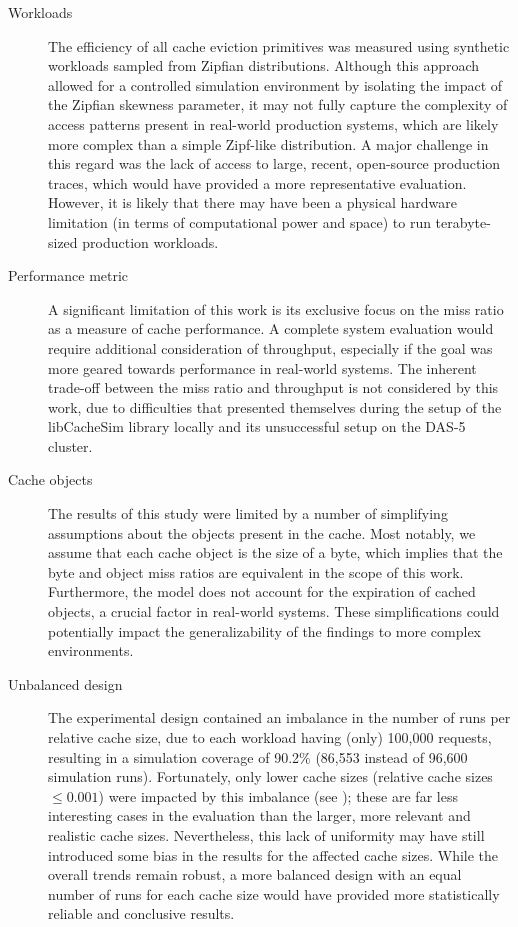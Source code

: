 \begin{description}
    \item[Workloads] The efficiency of all cache eviction primitives was measured using synthetic workloads sampled from Zipfian distributions. Although this approach allowed for a controlled simulation environment by isolating the impact of the Zipfian skewness parameter, it may not fully capture the complexity of access patterns present in real-world production systems, which are likely more complex than a simple Zipf-like distribution. A major challenge in this regard was the lack of access to large, recent, open-source production traces, which would have provided a more representative evaluation. However, it is likely that there may have been a physical hardware limitation (in terms of computational power and space) to run terabyte-sized production workloads.
    
    \item[Performance metric] A significant limitation of this work is its exclusive focus on the miss ratio as a measure of cache performance. A complete system evaluation would require additional consideration of throughput, especially if the goal was more geared towards performance in real-world systems. The inherent trade-off between the miss ratio and throughput is not considered by this work, due to difficulties that presented themselves during the setup of the libCacheSim library locally and its unsuccessful setup on the DAS-5 cluster.
    
    \item[Cache objects] The results of this study were limited by a number of simplifying assumptions about the objects present in the cache. Most notably, we assume that each cache object is the size of a byte, which implies that the byte and object miss ratios are equivalent in the scope of this work. Furthermore, the model does not account for the expiration of cached objects, a crucial factor in real-world systems. These simplifications could potentially impact the generalizability of the findings to more complex environments.
    
    \item[Unbalanced design] The experimental design contained an imbalance in the number of runs per relative cache size, due to each workload having (only) 100,000 requests, resulting in a simulation coverage of 90.2\% (86,553 instead of 96,600 simulation runs). Fortunately, only lower cache sizes (relative cache sizes $\le 0.001$) were impacted by this imbalance (see ); these are far less interesting cases in the evaluation than the larger, more relevant and realistic cache sizes. Nevertheless, this lack of uniformity may have still introduced some bias in the results for the affected cache sizes. While the overall trends remain robust, a more balanced design with an equal number of runs for each cache size would have provided more statistically reliable and conclusive results.
\end{description}



